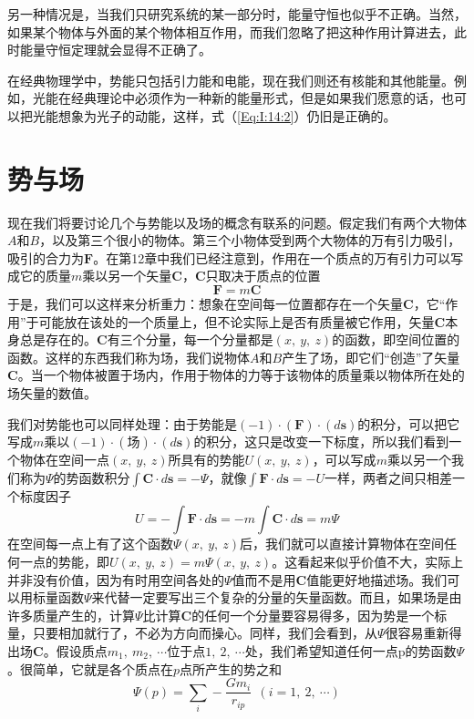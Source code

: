 另一种情况是，当我们只研究系统的某一部分时，能量守恒也似乎不正确。当然，如果某个物体与外面的某个物体相互作用，而我们忽略了把这种作用计算进去，此时能量守恒定理就会显得不正确了。

在经典物理学中，势能只包括引力能和电能，现在我们则还有核能和其他能量。例如，光能在经典理论中必须作为一种新的能量形式，但是如果我们愿意的话，也可以把光能想象为光子的动能，这样，式（\ref{Eq:I:14:2}）仍旧是正确的。

\section{势与场}

现在我们将要讨论几个与势能以及场的概念有联系的问题。假定我们有两个大物体$A$和$B$，以及第三个很小的物体。第三个小物体受到两个大物体的万有引力吸引，吸引的合力为$\boldsymbol{F}$。在第12章中我们已经注意到，作用在一个质点的万有引力可以写成它的质量$m$乘以另一个矢量$\boldsymbol{C}$，$\boldsymbol{C}$只取决于质点的位置
\begin{equation*}
    \boldsymbol{F}=m\boldsymbol{C}
\end{equation*}
于是，我们可以这样来分析重力：想象在空间每一位置都存在一个矢量$\boldsymbol{C}$，它“作用”于可能放在该处的一个质量上，但不论实际上是否有质量被它作用，矢量$\boldsymbol{C}$本身总是存在的。$\boldsymbol{C}$有三个分量，每一个分量都是$(x,~y,~z)$的函数，即空间位置的函数。这样的东西我们称为场，我们说物体$A$和$B$产生了场，即它们“创造”了矢量$\boldsymbol{C}$。当一个物体被置于场内，作用于物体的力等于该物体的质量乘以物体所在处的场矢量的数值。

我们对势能也可以同样处理：由于势能是$(-1)·(\boldsymbol{F})·(d\boldsymbol{s})$的积分，可以把它写成$m$乘以$(-1) \cdot (\text{场}) \cdot (d\boldsymbol{s})$的积分，这只是改变一下标度，所以我们看到一个物体在空间一点$(x,~y,~z)$所具有的势能$U(x,~y,~z)$，可以写成$m$乘以另一个我们称为$\varPsi $的势函数积分$\int \boldsymbol{C} \cdot d\boldsymbol{s}=- \varPsi$，就像$\int \boldsymbol{F} \cdot d\boldsymbol{s}=-U$一样，两者之间只相差一个标度因子
\begin{equation}
    \label{Eq:I:14:7}
    U=-\int \boldsymbol{F} \cdot d\boldsymbol{s}=-m \int \boldsymbol{C} \cdot d\boldsymbol{s}=m \varPsi
\end{equation}
在空间每一点上有了这个函数$\varPsi(x,~y,~z)$后，我们就可以直接计算物体在空间任何一点的势能，即$U(x,~y,~z)=m\varPsi (x,~y,~z)$。这看起来似乎价值不大，实际上并非没有价值，因为有时用空间各处的$\varPsi$值而不是用$\boldsymbol{C}$值能更好地描述场。我们可以用标量函数$\varPsi$来代替一定要写出三个复杂的分量的矢量函数。而且，如果场是由许多质量产生的，计算$\varPsi$比计算$\boldsymbol{C}$的任何一个分量要容易得多，因为势是一个标量，只要相加就行了，不必为方向而操心。同样，我们会看到，从$\varPsi$很容易重新得出场$\boldsymbol{C}$。假设质点$m_1,~m_2,~ \cdots$位于点$1,~2,~\cdots$处，我们希望知道任何一点p的势函数$\varPsi$。很简单，它就是各个质点在$p$点所产生的势之和
\begin{equation}
    \label{Eq:I:14:8}
    \varPsi (p) = \sum_i - \frac{Gm_i}{r_{ip}} ~~(i=1,~2,~\cdots)
\end{equation}

